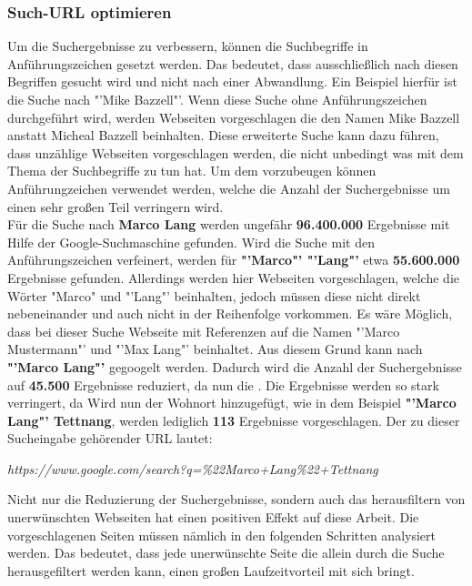 		\subsubsection{Such-URL optimieren}
			Um die Suchergebnisse zu verbessern, können die Suchbegriffe in Anführungszeichen gesetzt werden. Das bedeutet, dass ausschließlich nach diesen Begriffen gesucht wird und nicht nach einer Abwandlung. Ein Beispiel hierfür ist die Suche nach "'Mike Bazzell"'. Wenn diese Suche ohne Anführungszeichen durchgeführt wird, werden Webseiten vorgeschlagen die den Namen Mike Bazzell anstatt Micheal Bazzell beinhalten. Diese erweiterte Suche kann dazu führen, dass unzählige Webseiten vorgeschlagen werden, die nicht unbedingt was mit dem Thema der Suchbegriffe zu tun hat. Um dem vorzubeugen können Anführungzeichen verwendet werden, welche die Anzahl der Suchergebnisse um einen sehr großen Teil verringern wird. \cite{Bazzell}\\
			Für die Suche nach \textbf{Marco Lang} werden ungefähr \textbf{96.400.000} Ergebnisse mit Hilfe der Google-Suchmaschine gefunden. Wird die Suche mit den Anführungszeichen verfeinert, werden für \textbf{"'Marco"' "'Lang"'} etwa \textbf{55.600.000} Ergebnisse gefunden. Allerdings werden hier Webseiten vorgeschlagen, welche die Wörter "Marco" und "'Lang"' beinhalten, jedoch müssen diese nicht direkt nebeneinander und auch nicht in der Reihenfolge vorkommen. Es wäre Möglich, dass bei dieser Suche Webseite mit Referenzen auf die Namen "'Marco Mustermann"' und "'Max Lang"' beinhaltet. Aus diesem Grund kann nach \textbf{"'Marco Lang"'} gegoogelt werden. Dadurch wird die Anzahl der Suchergebnisse auf \textbf{45.500} Ergebnisse reduziert, da nun die . Die Ergebnisse werden so stark verringert, da Wird nun der Wohnort hinzugefügt, wie in dem Beispiel \textbf{"'Marco Lang"' Tettnang}, werden lediglich \textbf{113} Ergebnisse vorgeschlagen. Der zu dieser Sucheingabe gehörender URL lautet:
		
			\textit{https://www.google.com/search?q=\%22Marco+Lang\%22+Tettnang}
		
			Nicht nur die Reduzierung der Suchergebnisse, sondern auch das herausfiltern von unerwünschten Webseiten hat einen positiven Effekt auf diese Arbeit. Die vorgeschlagenen Seiten müssen nämlich in den folgenden Schritten analysiert werden. Das bedeutet, dass jede unerwünschte Seite die allein durch die Suche herausgefiltert werden kann, einen großen Laufzeitvorteil mit sich bringt. 
		
